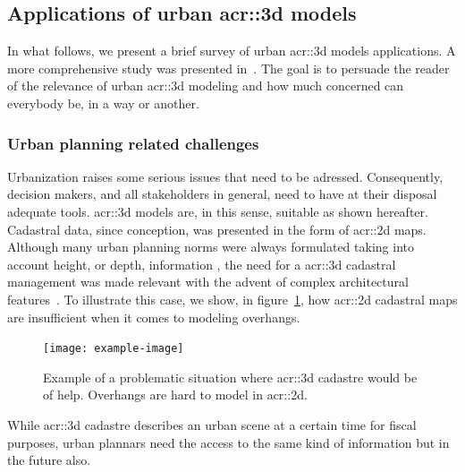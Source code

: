     \subsection{Applications of urban \gls*{acr::3d} models}
        \label{subsec::introduction::urban_3d_reconstruction::applications}
        In what follows, we present a brief survey of  urban \gls{acr::3d} models applications.
        A more comprehensive study was presented in~\textcite{ijgi4042842}.
        The goal is to persuade the reader of the relevance of urban \gls{acr::3d} modeling and how much concerned can everybody be, in a way or another.

        \subsubsection{Urban planning related challenges}
            Urbanization raises some serious issues that need to be adressed.
            Consequently, decision makers, and all stakeholders in general, need to have at their disposal adequate tools.
            \gls{acr::3d} models are, in this sense, suitable as shown hereafter.\\
            Cadastral data, since conception, was presented in the form of \gls{acr::2d} maps\addref.
            Although many urban planning norms were always formulated taking into account height, or depth, information \addref, the need for a \gls{acr::3d} cadastral management was made relevant with the advent of complex architectural features~\textcite{ijgi4042842}.
            To illustrate this case, we show, in figure~\ref{fig::3d_cadastre_need_example}, how \gls{acr::2d} cadastral maps are insufficient when it comes to modeling overhangs.
            \\
            \begin{figure}[htpb]
                \centering
                \texttt{[image: example-image]}            
                \caption{\label{fig::3d_cadastre_need_example} Example of a problematic situation where \gls{acr::3d} cadastre would be of help. Overhangs are hard to model in \gls{acr::2d}.}
            \end{figure}
            While \gls{acr::3d} cadastre describes an urban scene at a certain time for fiscal purposes, urban plannars need the access to the same kind of information but in the future also.
